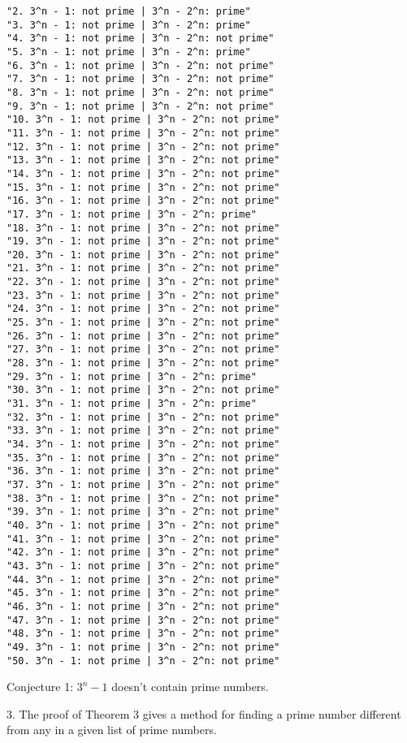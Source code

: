 \documentclass{article}
\begin{document}
\begin{verbatim}
"2. 3^n - 1: not prime | 3^n - 2^n: prime"
"3. 3^n - 1: not prime | 3^n - 2^n: prime"
"4. 3^n - 1: not prime | 3^n - 2^n: not prime"
"5. 3^n - 1: not prime | 3^n - 2^n: prime"
"6. 3^n - 1: not prime | 3^n - 2^n: not prime"
"7. 3^n - 1: not prime | 3^n - 2^n: not prime"
"8. 3^n - 1: not prime | 3^n - 2^n: not prime"
"9. 3^n - 1: not prime | 3^n - 2^n: not prime"
"10. 3^n - 1: not prime | 3^n - 2^n: not prime"
"11. 3^n - 1: not prime | 3^n - 2^n: not prime"
"12. 3^n - 1: not prime | 3^n - 2^n: not prime"
"13. 3^n - 1: not prime | 3^n - 2^n: not prime"
"14. 3^n - 1: not prime | 3^n - 2^n: not prime"
"15. 3^n - 1: not prime | 3^n - 2^n: not prime"
"16. 3^n - 1: not prime | 3^n - 2^n: not prime"
"17. 3^n - 1: not prime | 3^n - 2^n: prime"
"18. 3^n - 1: not prime | 3^n - 2^n: not prime"
"19. 3^n - 1: not prime | 3^n - 2^n: not prime"
"20. 3^n - 1: not prime | 3^n - 2^n: not prime"
"21. 3^n - 1: not prime | 3^n - 2^n: not prime"
"22. 3^n - 1: not prime | 3^n - 2^n: not prime"
"23. 3^n - 1: not prime | 3^n - 2^n: not prime"
"24. 3^n - 1: not prime | 3^n - 2^n: not prime"
"25. 3^n - 1: not prime | 3^n - 2^n: not prime"
"26. 3^n - 1: not prime | 3^n - 2^n: not prime"
"27. 3^n - 1: not prime | 3^n - 2^n: not prime"
"28. 3^n - 1: not prime | 3^n - 2^n: not prime"
"29. 3^n - 1: not prime | 3^n - 2^n: prime"
"30. 3^n - 1: not prime | 3^n - 2^n: not prime"
"31. 3^n - 1: not prime | 3^n - 2^n: prime"
"32. 3^n - 1: not prime | 3^n - 2^n: not prime"
"33. 3^n - 1: not prime | 3^n - 2^n: not prime"
"34. 3^n - 1: not prime | 3^n - 2^n: not prime"
"35. 3^n - 1: not prime | 3^n - 2^n: not prime"
"36. 3^n - 1: not prime | 3^n - 2^n: not prime"
"37. 3^n - 1: not prime | 3^n - 2^n: not prime"
"38. 3^n - 1: not prime | 3^n - 2^n: not prime"
"39. 3^n - 1: not prime | 3^n - 2^n: not prime"
"40. 3^n - 1: not prime | 3^n - 2^n: not prime"
"41. 3^n - 1: not prime | 3^n - 2^n: not prime"
"42. 3^n - 1: not prime | 3^n - 2^n: not prime"
"43. 3^n - 1: not prime | 3^n - 2^n: not prime"
"44. 3^n - 1: not prime | 3^n - 2^n: not prime"
"45. 3^n - 1: not prime | 3^n - 2^n: not prime"
"46. 3^n - 1: not prime | 3^n - 2^n: not prime"
"47. 3^n - 1: not prime | 3^n - 2^n: not prime"
"48. 3^n - 1: not prime | 3^n - 2^n: not prime"
"49. 3^n - 1: not prime | 3^n - 2^n: not prime"
"50. 3^n - 1: not prime | 3^n - 2^n: not prime"
\end{verbatim}
Conjecture 1: $3^n - 1$ doesn't contain prime numbers.
\vspace{40pt}

3. The proof of Theorem 3 gives a method for finding a prime number different
from any in a given list of prime numbers.
\end{document}
